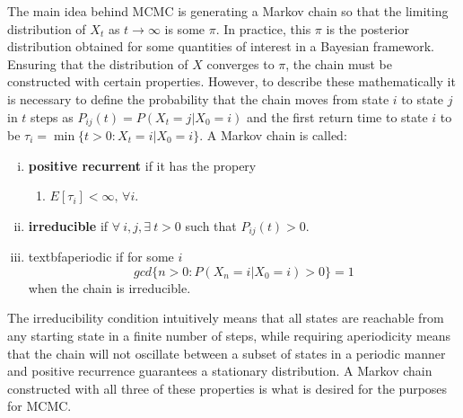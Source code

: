 
	

The main idea behind MCMC is generating a Markov chain so that the limiting distribution of $X_t$ as $t\rightarrow\infty$ is some $\pi$. 
In practice, this $\pi$ is the posterior distribution obtained for some quantities of interest in a Bayesian framework. 
Ensuring that the distribution of $X$ converges to $\pi$, the chain must be constructed with certain properties. However, to describe these mathematically it is necessary to define the probability that the chain moves from state $i$ to state $j$ in $t$ steps as $ P_{ij}(t) = P(X_t = j | X_0 = i)$
and the first return time to state $i$ to be $\tau_{i} = \min\{t>0:X_t = i|X_0 = i\}$. A Markov chain is called:
    \begin{enumerate}[(i)]
        \item \textbf{positive recurrent} if it has the propery
            \begin{enumerate}
                \item $E[\tau_{i}] < \infty ,\, \forall i$.
            \end{enumerate}
        
        \item \textbf{irreducible} if $\forall~i,j, \exists~t > 0$ such that $P_{ij}(t) > 0$.
        \item textbf{aperiodic} if for some $i$
            $$gcd\{n>0:P(X_n = i|X_0 = i) > 0\} =1 $$
            when the chain is irreducible.
    \end{enumerate}
The irreducibility condition intuitively means that all states are reachable from any starting state in a finite number of steps, while requiring aperiodicity means that the chain will not oscillate between a subset of states in a periodic manner and positive recurrence guarantees a stationary distribution. A Markov chain constructed with all three of these properties is what is desired for the purposes for MCMC.

